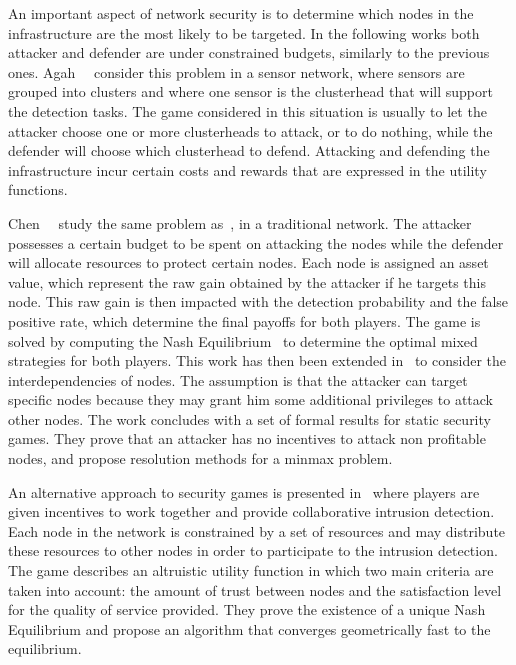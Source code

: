  An important aspect of network security is to determine which nodes in the infrastructure are the most likely to be targeted. 
 In the following works both attacker and defender are under constrained budgets, similarly to the previous ones.
 Agah~\etal~\cite{agah2004} consider this problem in a sensor network, where sensors are grouped into clusters and where one sensor is the clusterhead that will support the detection tasks.
 The game considered in this situation is usually to let the attacker choose one or more clusterheads to attack, or to do nothing, while the defender will choose which clusterhead to defend.
 Attacking and defending the infrastructure incur certain costs and rewards that are expressed in the utility functions.
 
 Chen~\etal~\cite{Chen2009} study the same problem as~\cite{agah2004}, in a traditional network. The attacker possesses a certain budget to be spent on attacking the nodes while the defender will allocate resources to protect certain nodes.
 Each node is assigned an asset value, which represent the raw gain obtained by the attacker if he targets this node.
 This raw gain is then impacted with the detection probability and the false positive rate, which determine the final payoffs for both players.
 The game is solved by computing the Nash Equilibrium~\cite{nasheq} to determine the optimal mixed strategies for both players.
 This work has then been extended in~\cite{interdep-ismail2017} to consider the interdependencies of nodes.
 The assumption is that the attacker can target specific nodes because they may grant him some additional privileges to attack other nodes.
 The work concludes with a set of formal results for static security games.
 They prove that an attacker has no incentives to attack non profitable nodes, and propose resolution methods for a minmax problem.
 
 An alternative approach to security games is presented in~\cite{Zhu2009b} where players are given incentives to work together and provide  collaborative intrusion detection.
 Each node in the network is constrained by a set of resources and may distribute these resources to other nodes in order to participate to the intrusion detection.
 The game describes an altruistic utility function in which two main criteria are taken into account: the amount of trust between nodes and the satisfaction level for the quality of service provided.
 They prove the existence of a unique Nash Equilibrium and propose an algorithm that converges geometrically fast to the equilibrium.

